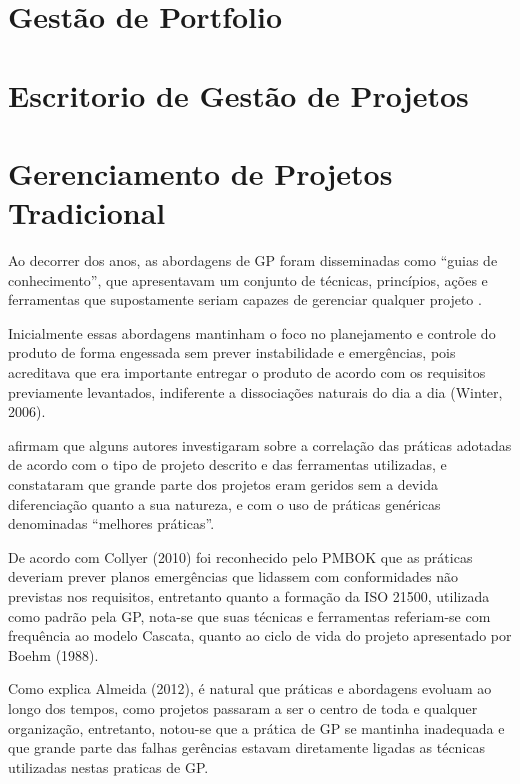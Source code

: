 \section{Gestão de Portfolio}

\section{Escritorio de Gestão de Projetos}


\section{Gerenciamento de Projetos Tradicional}

Ao decorrer dos anos, as abordagens de GP foram disseminadas como “guias de conhecimento”, que apresentavam um conjunto de técnicas, princípios, ações e ferramentas que supostamente seriam capazes de gerenciar qualquer projeto \cite{kolltveit2007perspectives, shenhar2007reinventing}.

Inicialmente essas abordagens mantinham o foco no planejamento e controle do produto de forma engessada sem prever instabilidade e emergências, pois acreditava que era importante entregar o produto de acordo com os requisitos previamente levantados, indiferente a dissociações naturais do dia a dia (Winter, 2006).

 afirmam que alguns autores investigaram sobre a correlação das práticas adotadas de acordo com o tipo de projeto descrito e das ferramentas utilizadas, e constataram que grande parte dos projetos eram geridos sem a devida diferenciação quanto a sua natureza, e com o uso de práticas genéricas denominadas “melhores práticas”.

De acordo com Collyer (2010) foi reconhecido pelo PMBOK que as práticas deveriam prever planos emergências que lidassem com conformidades não previstas nos requisitos, entretanto quanto a formação da ISO 21500, utilizada como padrão pela GP, nota-se que suas técnicas e ferramentas referiam-se com frequência ao modelo Cascata, quanto ao ciclo de vida do projeto apresentado por Boehm (1988).

Como explica Almeida (2012), é natural que práticas e abordagens evoluam ao longo dos tempos, como projetos passaram a ser o centro de toda e qualquer organização, entretanto, notou-se que a prática de GP se mantinha inadequada e que grande parte das falhas gerências estavam diretamente ligadas as técnicas utilizadas nestas praticas de GP.


